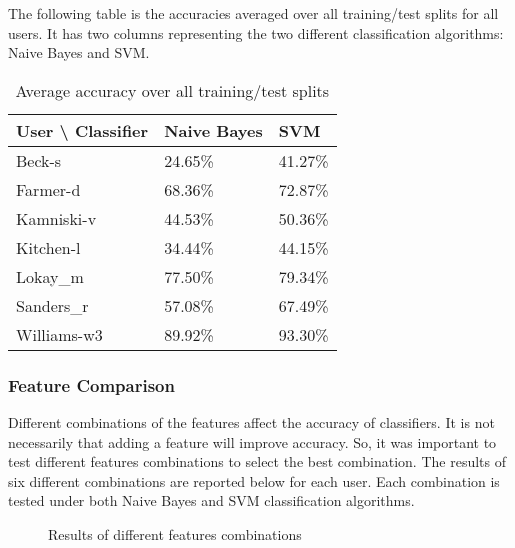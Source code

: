 The following table is the accuracies averaged over all training/test splits for all users. It has two columns representing the two different classification algorithms: Naive Bayes and SVM.

\begin{table} [!htbp]
	\begin{center}

	    \begin{tabular}{ | l | l | l |}
	    \hline
	    User {\textbackslash}  Classifier & Naive Bayes & SVM \\ \hline
	    Beck-s & 24.65\% & 41.27\% \\ \hline
	    Farmer-d & 68.36\% & 72.87\% \\ \hline
	    Kamniski-v & 44.53\% & 50.36\% \\ \hline
	    Kitchen-l & 34.44\% & 44.15\% \\ \hline
	    Lokay\_m & 77.50\% & 79.34\% \\ \hline
	    Sanders\_r & 57.08\% & 67.49\% \\ \hline
	    Williams-w3 & 89.92\% & 93.30\% \\
	    \hline
	    \end{tabular}
	\caption{Average accuracy over all training/test splits}
	\end{center}
\end{table}

\subsubsection{Feature Comparison}
Different combinations of the features affect the accuracy of classifiers. It is not necessarily that adding a feature will improve accuracy. So, it was important to test different features combinations to select the best combination. The results of six different combinations are reported below for each user. Each combination is tested under both Naive Bayes and SVM classification algorithms.

\begin{figure}[H]
    \begin{center}
    \end{center}
    \caption{Results of different features combinations}
\end{figure}

